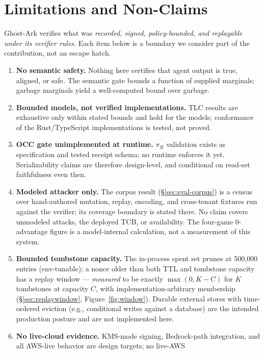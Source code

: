 \documentclass[10pt,twocolumn,letterpaper]{article}
\newcommand{\globaladvantage}{0}
\newcommand{\ghostark}{Ghost-Ark}
\newcommand{\piR}{\pi_R}
\begin{document}
\section{Limitations and Non-Claims}
\label{sec:nonclaims}

\ghostark{} verifies what was \emph{recorded, signed, policy-bounded, and
replayable under its verifier rules}. Each item below is a boundary we
consider part of the contribution, not an escape hatch.

\begin{enumerate}
\item \textbf{No semantic safety.} Nothing here certifies that agent output
is true, aligned, or safe. The semantic gate bounds a function of supplied
marginals; garbage marginals yield a well-computed bound over garbage.
\item \textbf{Bounded models, not verified implementations.} TLC results are
exhaustive only within stated bounds and hold for the models; conformance of
the Rust/TypeScript implementations is tested, not proved.
\item \textbf{OCC gate unimplemented at runtime.} $\piR$ validation exists as
specification and tested receipt schema; no runtime enforces it yet.
Serializability claims are therefore design-level, and conditional on
read-set faithfulness even then.
\item \textbf{Modeled attacker only.} The corpus result
(\S\ref{sec:eval-corpus}) is a census over hand-authored mutation, replay,
encoding, and cross-tenant fixtures run against the verifier; its coverage
boundary is stated there. No claim covers unmodeled attacks, the deployed
TCB, or availability. The four-game \globaladvantage{}-advantage figure is a
model-internal calculation, not a measurement of this system.
\item \textbf{Bounded tombstone capacity.} The in-process spent set prunes
at 500{,}000 entries (env-tunable); a nonce older than both TTL and tombstone
capacity has a replay window --- \emph{measured} to be exactly $\max(0,K-C)$
for $K$ tombstones at capacity $C$, with implementation-arbitrary membership
(\S\ref{sec:replaywindow}, Figure~\ref{fig:window}). Durable external stores
with time-ordered eviction (e.g., conditional writes against a database) are
the intended production posture and are not implemented here.
\item \textbf{No live-cloud evidence.} KMS-mode signing, Bedrock-path
integration, and all AWS-live behavior are design targets; no live-AWS

\end{enumerate}
\end{document}
